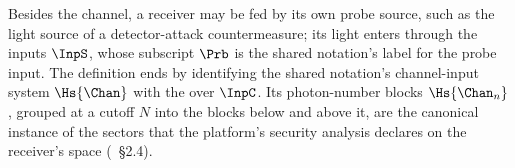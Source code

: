 
Besides the channel, a receiver may be fed by its own probe source, such as the
light source of a detector-attack countermeasure; its light enters through the
inputs $\InpS$, whose subscript $\Prb$ is the shared notation's label for the
probe input. The definition ends by identifying the shared notation's
channel-input system $\Hs{\Chan}$ with the  over $\InpC$. Its
photon-number blocks $\Hs{\Chan_n}$, grouped at a cutoff $N$ into the blocks
below and above it, are the canonical instance of the sectors that the
platform's security analysis declares on the receiver's space
(~\S2.4).

